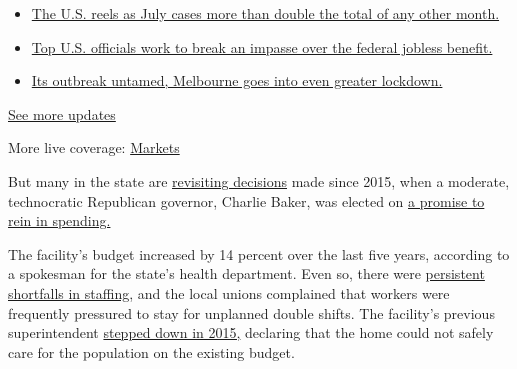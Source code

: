 \begin{itemize}
\tightlist
\item
  \href{https://www.nytimes.com/2020/08/01/world/coronavirus-covid-19.html?action=click\&pgtype=Article\&state=default\&region=MAIN_CONTENT_1\&context=storylines_live_updates\#link-34047410}{The
  U.S. reels as July cases more than double the total of any other
  month.}
\item
  \href{https://www.nytimes.com/2020/08/01/world/coronavirus-covid-19.html?action=click\&pgtype=Article\&state=default\&region=MAIN_CONTENT_1\&context=storylines_live_updates\#link-780ec966}{Top
  U.S. officials work to break an impasse over the federal jobless
  benefit.}
\item
  \href{https://www.nytimes.com/2020/08/01/world/coronavirus-covid-19.html?action=click\&pgtype=Article\&state=default\&region=MAIN_CONTENT_1\&context=storylines_live_updates\#link-2bc8948}{Its
  outbreak untamed, Melbourne goes into even greater lockdown.}
\end{itemize}

\href{https://www.nytimes.com/2020/08/01/world/coronavirus-covid-19.html?action=click\&pgtype=Article\&state=default\&region=MAIN_CONTENT_1\&context=storylines_live_updates}{See
more updates}

More live coverage:
\href{https://www.nytimes.com/live/2020/07/31/business/stock-market-today-coronavirus?action=click\&pgtype=Article\&state=default\&region=MAIN_CONTENT_1\&context=storylines_live_updates}{Markets}

But many in the state are
\href{https://www.bostonglobe.com/2020/05/12/opinion/did-baker-administration-pay-lip-service-holyoke-soldiers-home/}{revisiting
decisions} made since 2015, when a moderate, technocratic Republican
governor, Charlie Baker, was elected on
\href{https://www.bostonglobe.com/metro/2016/12/06/baker-cut-million-from-state-budget/mV9k1k6H4Ce9xSkqGC0sHM/story.html}{a
promise to rein in spending.}

The facility's budget increased by 14 percent over the last five years,
according to a spokesman for the state's health department. Even so,
there were
\href{https://pioneerinstitute.org/covid/holyoke-soldiers-home-study-targets-inadequate-nursing-home-staffing-standards/}{persistent
shortfalls in staffing}, and the local unions complained that workers
were frequently pressured to stay for unplanned double shifts. The
facility's previous superintendent
\href{https://www.masslive.com/news/2015/12/holyoke_soldiers_home_meeting_1.html}{stepped
down in 2015,} declaring that the home could not safely care for the
population on the existing budget.


